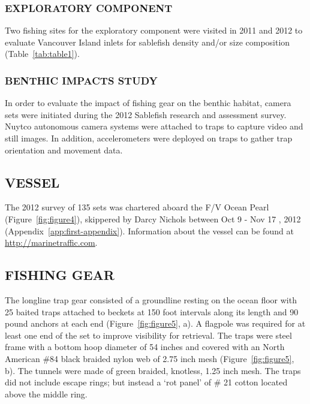 \documentclass[12pt]{article}\usepackage[]{graphicx}\usepackage[]{color}
\begin{document}
\hypertarget{exploratory-component}{%
\subsubsection{EXPLORATORY COMPONENT}\label{exploratory-component}}

Two fishing sites for the exploratory component were visited in 2011 and 2012 to evaluate Vancouver Island inlets for sablefish density and/or size composition (Table~\ref{tab:table1}).

\hypertarget{benthic-impacts-study}{%
\subsubsection{BENTHIC IMPACTS STUDY}\label{benthic-impacts-study}}

In order to evaluate the impact of fishing gear on the benthic habitat, camera sets were initiated during the 2012 Sablefish research and assessment survey. Nuytco autonomous camera systems were attached to traps to capture video and still images. In addition, accelerometers were deployed on traps to gather trap orientation and movement data.

\hypertarget{vessel}{%
\subsection{VESSEL}\label{vessel}}

The 2012 survey of 135 sets was chartered aboard the F/V Ocean Pearl (Figure~\ref{fig:figure4}), skippered by Darcy Nichols between Oct 9 - Nov 17 , 2012 (Appendix~\ref{app:first-appendix}). Information about the vessel can be found at \href{http://marinetraffic.com}{\underline{http://marinetraffic.com}}.

\hypertarget{fishing-gear}{%
\subsection{FISHING GEAR}\label{fishing-gear}}

The longline trap gear consisted of a groundline resting on the ocean floor with 25 baited traps attached to beckets at 150 foot intervals along its length and 90 pound anchors at each end (Figure~\ref{fig:figure5}, a). A flagpole was required for at least one end of the set to improve visibility for retrieval. The traps were steel frame with a bottom hoop diameter of 54 inches and covered with an North American \#84 black braided nylon web of 2.75 inch mesh (Figure~\ref{fig:figure5}, b). The tunnels were made of green braided, knotless, 1.25 inch mesh. The traps did not include escape rings; but instead a `rot panel' of \# 21 cotton located above the middle ring.
\end{document}
